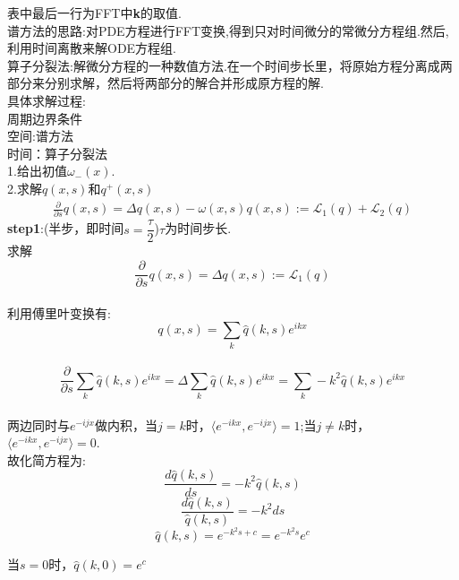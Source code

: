 \documentclass[12pt]{article}
\begin{document}
\begin{CJK}{UTF8}{gkai}
表中最后一行为FFT中\textbf{k}的取值.\\
	 

    谱方法的思路:对PDE方程进行FFT变换,得到只对时间微分的常微分方程组.然后,利用时间离散来解ODE方程组.\\
    
    算子分裂法:解微分方程的一种数值方法.在一个时间步长里，将原始方程分离成两部分来分别求解，然后将两部分的解合并形成原方程的解.\\
    
    具体求解过程:\\
    
    周期边界条件\\
   
    空间:谱方法\\
  
    时间：算子分裂法 \\
    
    1.给出初值$\omega_-(x)$.\\
    
    2.求解$q(x,s)$和$q^+(x,s)$\\
     \begin{gather}
    \frac{\partial}{\partial s}q(x,s)=\Delta q(x,s)-\omega(x,s)q(x,s)  :=\mathcal{L}_1(q)+ \mathcal{L}_2(q) 
    \end{gather}
    \textbf{step1}:(半步，即时间$s=\dfrac{\tau}{2}$)$\tau$为时间步长.\\
    
    求解$$\frac{\partial}{\partial s}q(x,s)=\Delta q(x,s):=\mathcal{L}_1(q)$$\\
    
    
     利用傅里叶变换有: $$q(x,s)= \sum_{k} \hat{q}(k,s)e^{ikx}$$\\
     
     $$\frac{\partial}{\partial s} \sum_{k}\hat{q}(k,s)e^{ikx} =\Delta\sum_{k}\hat{q} (k,s)e^{ikx}=\sum_{k}-k^2\hat{q}(k,s)e^{ikx}$$\\
     
     两边同时与$e^{-ijx}$做内积，当$j=k$时，$\langle e^{-ikx},e^{-ijx}\rangle=1$;当$j \neq k$时，$\langle e^{-ikx},e^{-ijx}\rangle=0.$\\
     
     故化简方程为:\\
     $$\frac{d\hat{q}(k,s)}{ds} = -k^2\hat{q}(k,s)$$
     $$ \frac{d\hat{q}(k,s)}{\hat{q}(k,s)} = -k^2ds $$
     $$\hat{q}(k,s)=e^{-k^2s+c}=e^{-k^2s}e^{c} $$
     
     当$s=0$时，$\hat{q}(k,0)= e^{c} $\\
     

\end{CJK}
\end{document}
